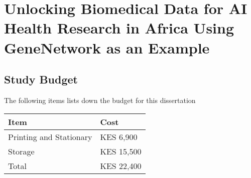 \documentclass[11pt]{book}
\date{}
\title{}
\begin{document}
\section*{Unlocking Biomedical Data for AI Health Research in Africa Using GeneNetwork as an Example}
\label{sec:orgb21de0f}
\subsection*{Study Budget}
\label{sec:orgc0cd25e}
The following items lists down the budget for this dissertation

\begin{center}
\begin{tabular}{ll}
Item & Cost\\[0pt]
\hline
Printing and Stationary & KES 6,900\\[0pt]
Storage & KES 15,500\\[0pt]
\hline
Total & KES 22,400\\[0pt]
\end{tabular}
\end{center}
\end{document}
